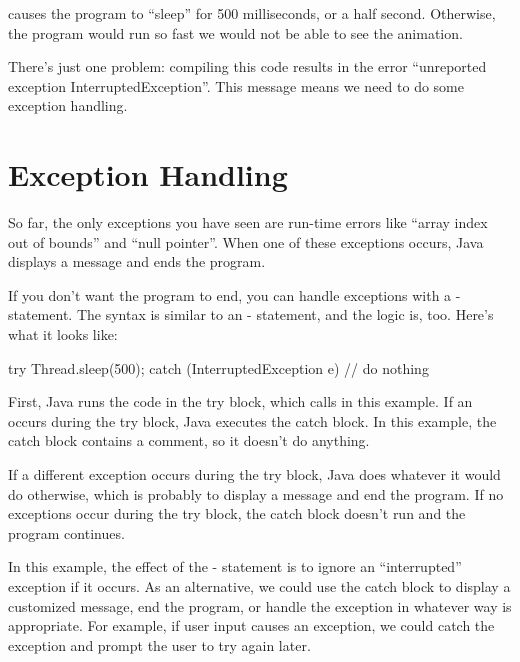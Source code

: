 
 causes the program to ``sleep'' for 500 milliseconds, or a half second.
Otherwise, the program would run so fast we would not be able to see the animation.


There's just one problem: compiling this code results in the error ``unreported exception InterruptedException''.
This message means we need to do some exception handling.


\section{Exception Handling}

So far, the only exceptions you have seen are run-time errors like ``array index out of bounds'' and ``null pointer''.
When one of these exceptions occurs, Java displays a message and ends the program.

If you don't want the program to end, you can handle exceptions with a - statement.
The syntax is similar to an - statement, and the logic is, too.
Here's what it looks like:


\begin{code}
try {
    Thread.sleep(500);
} catch (InterruptedException e) {
    // do nothing
}
\end{code}

First, Java runs the code in the try block, which calls  in this example.
If an  occurs during the try block, Java executes the catch block.
In this example, the catch block contains a comment, so it doesn't do anything.

If a different exception occurs during the try block, Java does whatever it would do otherwise, which is probably to display a message and end the program.
If no exceptions occur during the try block, the catch block doesn't run and the program continues.

In this example, the effect of the - statement is to ignore an ``interrupted'' exception if it occurs.
As an alternative, we could use the catch block to display a customized message, end the program, or handle the exception in whatever way is appropriate.
For example, if user input causes an exception, we could catch the exception and prompt the user to try again later.

